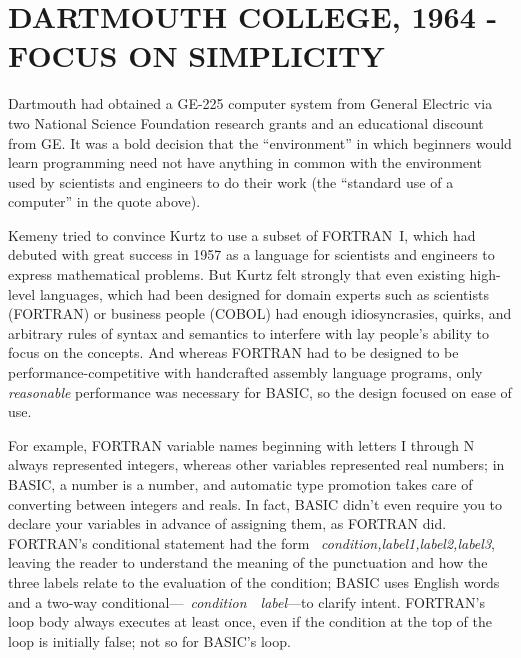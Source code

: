 
\section{DARTMOUTH COLLEGE, 1964 - FOCUS ON SIMPLICITY}



Dartmouth had obtained a GE-225 computer system from General Electric
via two National Science Foundation research grants and
an educational discount from GE.  It was a bold decision that the
``environment'' in which beginners would learn programming need not have
anything in common with the environment used by scientists and engineers
to do their work (the ``standard use of a computer'' in the quote above).


Kemeny tried to convince Kurtz to use a subset of FORTRAN~I, which had
debuted with great success in 1957 as a language for scientists and
engineers to express mathematical problems.  
But Kurtz felt strongly that even existing high-level
languages, which had been designed for domain experts such as scientists
(FORTRAN) or business people (COBOL) 
had enough idiosyncrasies, quirks, and arbitrary rules of syntax and
semantics to interfere with lay people's ability to focus on the
concepts.  
And whereas FORTRAN had to be designed to be performance-competitive with
handcrafted assembly language programs, 
only \emph{reasonable} performance was necessary for BASIC, so the
design focused on 
ease of use.

For example, FORTRAN variable names beginning with letters I
through N always represented integers, whereas other variables represented
real numbers; in BASIC, a number is a number, and automatic type
promotion takes care of converting between integers and reals.  In
fact, BASIC didn't even require you to declare your variables in
advance of assigning them, as FORTRAN did.  FORTRAN's
conditional statement had the form 
~\emph{condition,label1,label2,label3}, leaving the reader to
understand the meaning of the punctuation and how the three labels
relate to the evaluation of the condition; BASIC uses English
words and a two-way
conditional---~\emph{condition}~~\emph{label}---to
clarify intent.  FORTRAN's  loop body always executes at least once,
even if the condition at the top of the loop is initially false; not
so for BASIC's  loop.

